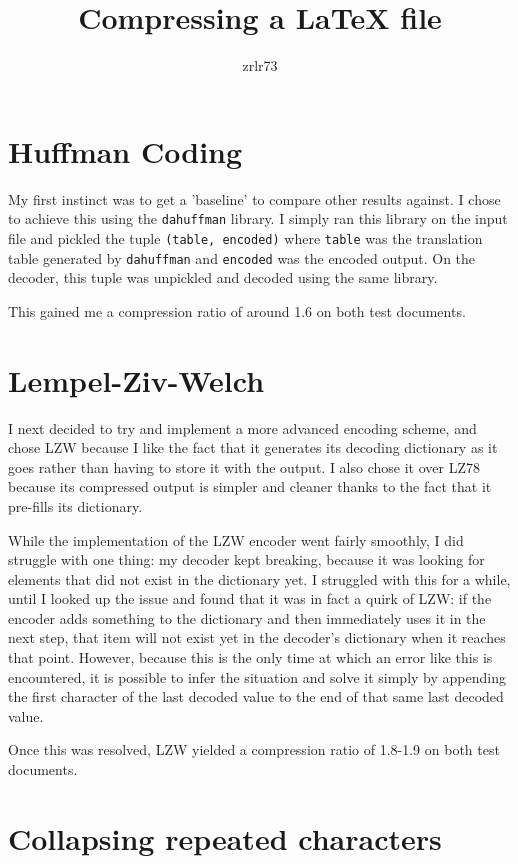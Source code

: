 \documentclass[11pt]{article} %
\title{\vspace{-1.6cm}Compressing a LaTeX file}
\author{zrlr73}
\date{} %
\begin{document}
\maketitle



\section{Huffman Coding}

My first instinct was to get a 'baseline' to compare other results against. I chose to achieve this using the \verb|dahuffman| library. I simply ran this library on the input file and pickled the tuple \verb|(table, encoded)| where \verb|table| was the translation table generated by \verb|dahuffman| and \verb|encoded| was the encoded output. On the decoder, this tuple was unpickled and decoded using the same library.

This gained me a compression ratio of around 1.6 on both test documents.


\section{Lempel-Ziv-Welch}

I next decided to try and implement a more advanced encoding scheme, and chose LZW because I like the fact that it generates its decoding dictionary as it goes rather than having to store it with the output. I also chose it over LZ78 because its compressed output is simpler and cleaner thanks to the fact that it pre-fills its dictionary.

While the implementation of the LZW encoder went fairly smoothly, I did struggle with one thing: my decoder kept breaking, because it was looking for elements that did not exist in the dictionary yet. I struggled with this for a while, until I looked up the issue and found that it was in fact a quirk of LZW: if the encoder adds something to the dictionary and then immediately uses it in the next step, that item will not exist yet in the decoder's dictionary when it reaches that point. However, because this is the only time at which an error like this is encountered, it is possible to infer the situation and solve it simply by appending the first character of the last decoded value to the end of that same last decoded value.

Once this was resolved, LZW yielded a compression ratio of 1.8-1.9 on both test documents.


\section{Collapsing repeated characters}
\end{document}
